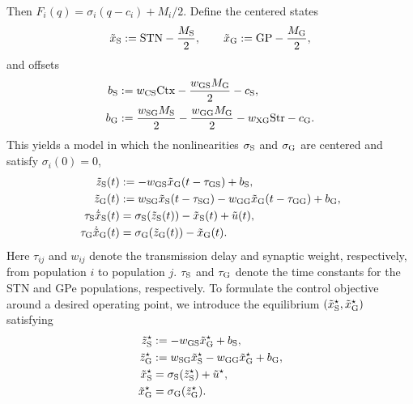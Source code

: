 Then $F_i(q)=\sigma_i(q-c_i)+M_i/2$. Define the centered states
\begin{equation*}
\tilde{x}_{{\mathrm{S}}}:={\mathrm{STN}}-\frac{M_{{\mathrm{S}}}}{2},
\qquad
\tilde{x}_{{\mathrm{G}}}:={\mathrm{GP}}-\frac{M_{{\mathrm{G}}}}{2},
\end{equation*}
and offsets
\begin{equation*}
\begin{aligned}
b_{{\mathrm{S}}}&:=w_{{\mathrm{CS}}}{\mathrm{Ctx}}-\frac{w_{{\mathrm{GS}}}M_{{\mathrm{G}}}}{2}-c_{{\mathrm{S}}},\\
b_{{\mathrm{G}}}&:=\frac{w_{{\mathrm{SG}}}M_{{\mathrm{S}}}}{2}-\frac{w_{{\mathrm{GG}}}M_{{\mathrm{G}}}}{2}
      -w_{{\mathrm{XG}}}{\mathrm{Str}}-c_{{\mathrm{G}}}.
\end{aligned}
\end{equation*}
This yields a model in which the nonlinearities $\sigma_{{\mathrm{S}}}$ and
$\sigma_{{\mathrm{G}}}$ are centered and satisfy $\sigma_i(0)=0$,
\begin{equation}\label{eq:stn-gpe-centered}
\begin{aligned}
\tilde{z}_{{\mathrm{S}}}(t)&:=-w_{{\mathrm{GS}}}\tilde{x}_{{\mathrm{G}}}(t-\tau_{{\mathrm{GS}}})+b_{{\mathrm{S}}},\\
\tilde{z}_{{\mathrm{G}}}(t)&:=w_{{\mathrm{SG}}}\tilde{x}_{{\mathrm{S}}}(t-\tau_{{\mathrm{SG}}})
          -w_{{\mathrm{GG}}}\tilde{x}_{{\mathrm{G}}}(t-\tau_{{\mathrm{GG}}})+b_{{\mathrm{G}}},\\
\tau_{{\mathrm{S}}}\dot{\tilde{x}}_{{\mathrm{S}}}(t)
      &=\sigma_{{\mathrm{S}}}(\tilde{z}_{{\mathrm{S}}}(t))
        -\tilde{x}_{{\mathrm{S}}}(t)+\tilde{u}(t),\\
\tau_{{\mathrm{G}}}\dot{\tilde{x}}_{{\mathrm{G}}}(t)
      &=\sigma_{{\mathrm{G}}}(\tilde{z}_{{\mathrm{G}}}(t))
        -\tilde{x}_{{\mathrm{G}}}(t).
\end{aligned}
\end{equation}
Here $\tau_{ij}$ and $w_{ij}$ denote the transmission delay and synaptic
weight, respectively, from population $i$ to population $j$.
$\tau_{{\mathrm{S}}}$ and $\tau_{{\mathrm{G}}}$ denote the time constants for the STN and GPe populations,
respectively. To formulate the control objective around a desired operating point, we introduce the equilibrium
 \((\tilde x_{{\mathrm{S}}}^\star,\tilde x_{{\mathrm{G}}}^\star)\) satisfying
\begin{align*}
      \tilde z_{{\mathrm{S}}}^\star&:=-w_{{\mathrm{GS}}}\tilde x_{{\mathrm{G}}}^\star+b_{{\mathrm{S}}},\\
      \tilde z_{{\mathrm{G}}}^\star&:=w_{{\mathrm{SG}}}\tilde x_{{\mathrm{S}}}^\star
          -w_{{\mathrm{GG}}}\tilde x_{{\mathrm{G}}}^\star+b_{{\mathrm{G}}},\\
      \tilde x_{{\mathrm{S}}}^\star
          &=\sigma_{{\mathrm{S}}}(\tilde z_{{\mathrm{S}}}^\star)+\tilde u^\star,\\
      \tilde x_{{\mathrm{G}}}^\star
          &=\sigma_{{\mathrm{G}}}(\tilde z_{{\mathrm{G}}}^\star).
\end{align*}
